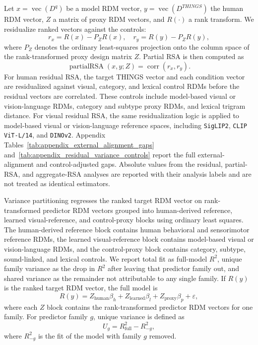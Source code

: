 \documentclass{article}
\begin{document}
Let \(x=\operatorname{vec}(D^q)\) be a model RDM vector, \(y=\operatorname{vec}(D^{THINGS})\) the human RDM vector, \(Z\) a matrix of proxy RDM vectors, and \(R(\cdot)\) a rank transform. We residualize ranked vectors against the controls:
\begin{equation}
  r_x = R(x)-P_ZR(x), \quad r_y = R(y)-P_ZR(y),
  \label{eq:appendix_resid}
\end{equation}
where \(P_Z\) denotes the ordinary least-squares projection onto the column space of the rank-transformed proxy design matrix \(Z\). Partial RSA is then computed as
\begin{equation}
  \operatorname{partialRSA}(x,y;Z)=\operatorname{corr}(r_x,r_y).
  \label{eq:appendix_partial_rsa}
\end{equation}
For human residual RSA, the target THINGS vector and each condition vector are residualized against visual, category, and lexical control RDMs before the residual vectors are correlated. These controls include model-based visual or vision-language RDMs, category and subtype proxy RDMs, and lexical trigram distance. For visual residual RSA, the same residualization logic is applied to model-based visual or vision-language reference spaces, including \texttt{SigLIP2}, \texttt{CLIP ViT-L/14}, and \texttt{DINOv2}. Appendix Tables~\ref{tab:appendix_external_alignment_gaps} and~\ref{tab:appendix_residual_variance_controls} report the full external-alignment and control-adjusted gaps. Absolute values from the residual, partial-RSA, and aggregate-RSA analyses are reported with their analysis labels and are not treated as identical estimators.

Variance partitioning regresses the ranked target RDM vector on rank-transformed predictor RDM vectors grouped into human-derived reference, learned visual-reference, and control-proxy blocks using ordinary least squares. The human-derived reference block contains human behavioral and sensorimotor reference RDMs, the learned visual-reference block contains model-based visual or vision-language RDMs, and the control-proxy block contains category, subtype, sound-linked, and lexical controls. We report total fit as full-model \(R^2\), unique family variance as the drop in \(R^2\) after leaving that predictor family out, and shared variance as the remainder not attributable to any single family.
If \(R(y)\) is the ranked target RDM vector, the full model is
\begin{equation}
  R(y)=Z_{\mathrm{human}}\beta_h + Z_{\mathrm{learned}}\beta_l + Z_{\mathrm{proxy}}\beta_p + \varepsilon,
  \label{eq:appendix_variance_partition}
\end{equation}
where each \(Z\) block contains the rank-transformed predictor RDM vectors for one family. For predictor family \(g\), unique variance is defined as
\begin{equation}
  U_g = R^2_{\mathrm{full}} - R^2_{-g},
  \label{eq:appendix_unique_variance}
\end{equation}
where \(R^2_{-g}\) is the fit of the model with family \(g\) removed.
\end{document}
